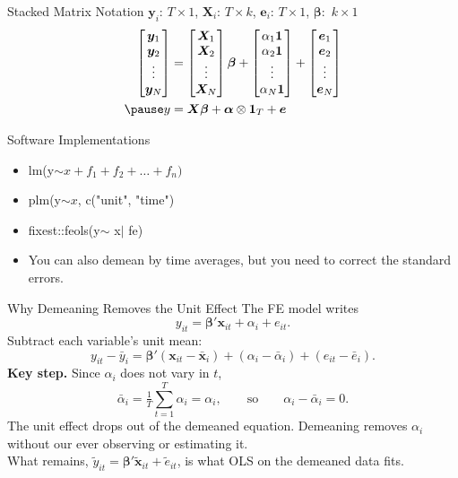 \documentclass[aspectratio=169, handout]{beamer}
\numberwithin{equation}{section}
\begin{document}
\begin{frame}{Stacked Matrix Notation}
$\bm{y}_i$: $T\times 1$, $\bm{X}_i$:  $T\times k$, $\bm{e}_i$: $T\times 1$, $\bm{\beta}:$ $k\times 1$
\pause
\begin{align*}
\begin{bmatrix}\bm{y}_1\\\bm{y}_2\\ \vdots \\ \bm{y}_N \end{bmatrix}&=\begin{bmatrix}\bm{X}_1\\\bm{X}_2\\ \vdots \\ \bm{X}_N \end{bmatrix} \bm{\beta}+\begin{bmatrix}\alpha_1 \bm{1}\\\alpha_2 \bm{1}\\ \vdots \\ \alpha_N \bm{1} \end{bmatrix}+\begin{bmatrix}\bm{e}_1\\\bm{e}_2\\ \vdots \\ \bm{e}_N \end{bmatrix}\\\pause
y&= \bm{X}\bm{\beta}+\bm{\alpha}\otimes \bm{1}_T+\bm{e}
\end{align*}
\end{frame}


\begin{frame}{Software Implementations}
\begin{itemize}
\item lm(y$\sim x+f_1+f_2+\ldots +f_n)$
\item plm(y$\sim x$, c("unit", "time")
\item fixest::feols(y$\sim$ x$|$ fe)
\item You can also demean by time averages, but you need to correct the standard errors.
\end{itemize}
\end{frame}


\begin{frame}{Why Demeaning Removes the Unit Effect}
The FE model writes
$$y_{it}=\bm{\beta}'\bm{x}_{it}+\alpha_i+e_{it}.$$
Subtract each variable's unit mean:
$$y_{it}-\bar{y}_i=\bm{\beta}'(\bm{x}_{it}-\bar{\bm{x}}_i)+(\alpha_i-\bar{\alpha}_i)+(e_{it}-\bar{e}_i).$$
\textbf{Key step.} Since $\alpha_i$ does not vary in $t$,
$$\bar{\alpha}_i = \tfrac{1}{T}\sum_{t=1}^T \alpha_i = \alpha_i, \qquad \text{so}\qquad \alpha_i-\bar{\alpha}_i = 0.$$
The unit effect drops out of the demeaned equation. Demeaning removes $\alpha_i$ without our ever observing or estimating it.\\[4pt]
What remains, $\tilde y_{it}=\bm{\beta}'\tilde{\bm{x}}_{it}+\tilde e_{it}$, is what OLS on the demeaned data fits.
\end{frame}
\end{document}
